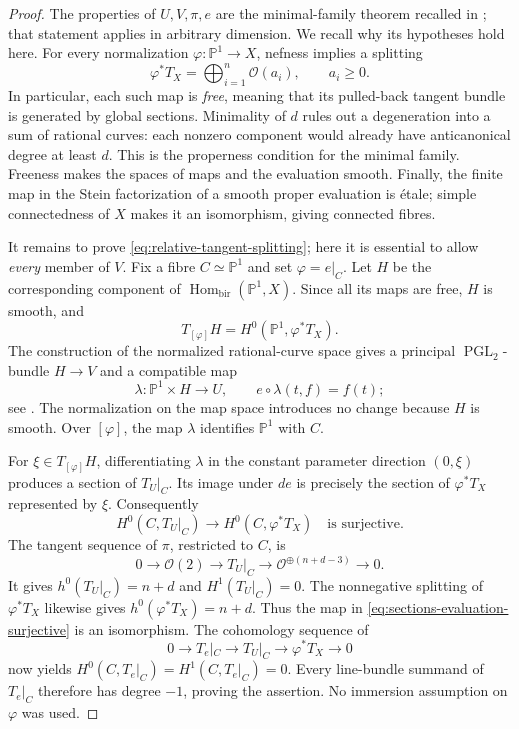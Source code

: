 \begin{proof}
The properties of $U,V,\pi,e$ are the minimal-family theorem recalled in
\cite[Proposition~1.6]{Kanemitsu2017}; that statement applies in arbitrary
dimension.  We recall why its hypotheses hold here.  For every
normalization $\varphi:\mathbb P^1\to X$, nefness implies a splitting
\[
 \varphi^*T_X=\bigoplus_{i=1}^n\mathcal O(a_i),\qquad a_i\geq0.
\]
In particular, each such map is \emph{free}, meaning that its pulled-back
tangent bundle is generated by global sections.  Minimality of $d$ rules
out a degeneration into a sum of rational curves: each nonzero component
would already have anticanonical degree at least $d$.  This is the
properness condition for the minimal family.  Freeness makes the spaces
of maps and the evaluation smooth.  Finally, the finite map in the Stein
factorization of a smooth proper evaluation is \'{e}tale; simple
connectedness of $X$ makes it an isomorphism, giving connected fibres.

It remains to prove \eqref{eq:relative-tangent-splitting}; here it is
essential to allow \emph{every} member of $V$.  Fix a fibre
$C\simeq\mathbb P^1$ and set $\varphi=e|_C$.  Let $H$ be the corresponding
component of $\operatorname{Hom}_{\mathrm{bir}}(\mathbb P^1,X)$.
Since all its maps are free, $H$ is smooth, and
\[
 T_{[\varphi]}H=H^0(\mathbb P^1,\varphi^*T_X).
\]
The construction of the normalized rational-curve space gives a
principal $\operatorname{PGL}_2$-bundle $H\to V$ and a compatible map
\[
 \lambda:\mathbb P^1\times H\longrightarrow U,
 \qquad e\circ\lambda(t,f)=f(t);
\]
see \cite[Sections~2.1--2.2]{BrionKannan2021}.
The normalization on the map space introduces no change because $H$ is
smooth.  Over $[\varphi]$, the map $\lambda$ identifies $\mathbb P^1$ with
$C$.

For $\xi\in T_{[\varphi]}H$, differentiating $\lambda$ in the constant
parameter direction $(0,\xi)$ produces a section of $T_U|_C$.
Its image under $de$ is precisely the section of $\varphi^*T_X$
represented by $\xi$.  Consequently
\begin{equation}\label{eq:sections-evaluation-surjective}
 H^0(C,T_U|_C)\longrightarrow H^0(C,\varphi^*T_X)
 \quad\text{is surjective}.
\end{equation}
The tangent sequence of $\pi$, restricted to $C$, is
\[
 0\longrightarrow\mathcal O(2)\longrightarrow T_U|_C
 \longrightarrow\mathcal O^{\oplus(n+d-3)}\longrightarrow0.
\]
It gives $h^0(T_U|_C)=n+d$ and $H^1(T_U|_C)=0$.
The nonnegative splitting of $\varphi^*T_X$ likewise gives
$h^0(\varphi^*T_X)=n+d$.  Thus the map in
\eqref{eq:sections-evaluation-surjective} is an isomorphism.
The cohomology sequence of
\[
 0\longrightarrow T_e|_C\longrightarrow T_U|_C
 \longrightarrow\varphi^*T_X\longrightarrow0
\]
now yields $H^0(C,T_e|_C)=H^1(C,T_e|_C)=0$.
Every line-bundle summand of $T_e|_C$ therefore has degree $-1$, proving
the assertion.  No immersion assumption on $\varphi$ was used.
\end{proof}

